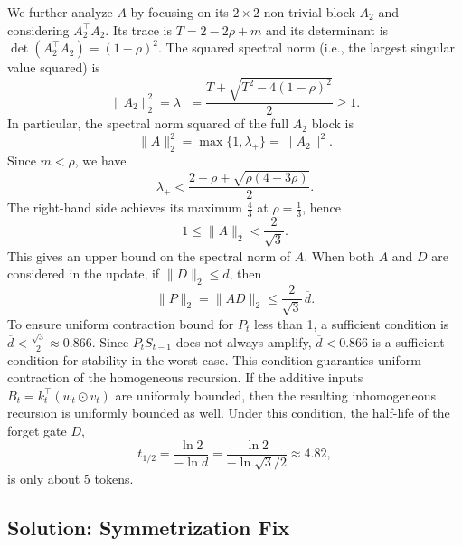 We further analyze $A$ by focusing on its $2\times 2$ non-trivial block $A_2$ and considering $A_2^\top A_2$. Its trace is $T=2-2\rho+m$ and its determinant is $\det(A_2^\top A_2)=(1-\rho)^2$. The squared spectral norm (i.e., the largest singular value squared) is
\begin{equation}
\lVert A_2\rVert_2^2 = \lambda_+ = \frac{T+\sqrt{T^2-4(1-\rho)^2}}{2} \ge 1.
\end{equation}
In particular, the spectral norm squared of the full $A_2$ block is
\begin{equation}
\lVert A\rVert_2^2 = \max\{1,\lambda_+\}=\lVert A_2\rVert^2.
\end{equation}
Since $m<\rho$, we have
\begin{equation}
\lambda_+ < \frac{2-\rho+\sqrt{\rho(4-3\rho)}}{2}.
\end{equation}
The right-hand side achieves its maximum $\frac{4}{3}$ at $\rho=\frac{1}{3}$, hence
\begin{equation}
1 \le \lVert A\rVert_2 < \frac{2}{\sqrt{3}}.
\end{equation}
This gives an upper bound on the spectral norm of $A$. When both $A$ and $D$ are considered in the update, if $\lVert D\rVert_2\le \overline{d}$, then
\begin{equation}
\lVert P\rVert_2 = \lVert AD\rVert_2 \le \frac{2}{\sqrt{3}}\,\overline{d}.
\end{equation}
To ensure uniform contraction bound for $P_t$ less than 1, a sufficient condition is $\overline{d} < \frac{\sqrt{3}}{2}\approx 0.866$. Since $P_t S_{t-1}$ does not always amplify, $\overline{d}<0.866$ is a sufficient condition for stability in the worst case.
This condition guaranties uniform contraction of the homogeneous recursion. If the additive inputs $B_t=k_t^\top(w_t\odot v_t)$ are uniformly bounded, then the resulting inhomogeneous recursion is uniformly bounded as well.
Under this condition, the half-life of the forget gate $D$,
\begin{equation}
t_{1/2}=\frac{\ln 2}{-\ln d}=\frac{\ln 2}{-\ln\sqrt{3}/{2}}\approx 4.82,
\end{equation}
is only about 5 tokens.

\subsection{Solution: Symmetrization Fix}

